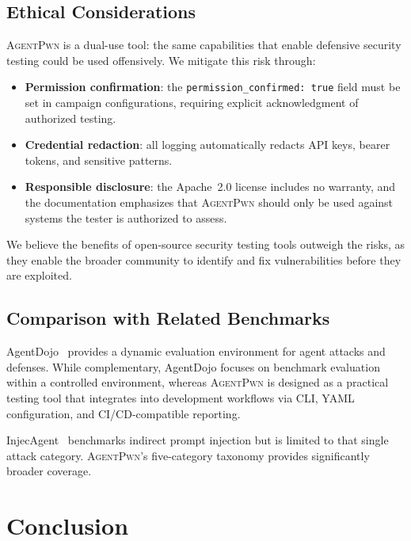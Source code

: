 \documentclass[letterpaper,twocolumn,10pt]{article}
\newcommand{\apwn}{\textsc{AgentPwn}}
\newcommand{\code}[1]{\texttt{#1}}
\begin{document}
\subsection{Ethical Considerations}

\apwn{} is a dual-use tool: the same capabilities that enable defensive security testing could be used offensively.
We mitigate this risk through:

\begin{itemize}[leftmargin=*, itemsep=1pt]
  \item \textbf{Permission confirmation}: the \code{permission\_confirmed: true} field must be set in campaign configurations, requiring explicit acknowledgment of authorized testing.
  \item \textbf{Credential redaction}: all logging automatically redacts API keys, bearer tokens, and sensitive patterns.
  \item \textbf{Responsible disclosure}: the Apache~2.0 license includes no warranty, and the documentation emphasizes that \apwn{} should only be used against systems the tester is authorized to assess.
\end{itemize}

We believe the benefits of open-source security testing tools outweigh the risks, as they enable the broader community to identify and fix vulnerabilities before they are exploited.

\subsection{Comparison with Related Benchmarks}

AgentDojo~\citep{debenedetti2024agentdojo} provides a dynamic evaluation environment for agent attacks and defenses.
While complementary, AgentDojo focuses on benchmark evaluation within a controlled environment, whereas \apwn{} is designed as a practical testing tool that integrates into development workflows via CLI, YAML configuration, and CI/CD-compatible reporting.

InjecAgent~\citep{zhan2024injecagent} benchmarks indirect prompt injection but is limited to that single attack category.
\apwn{}'s five-category taxonomy provides significantly broader coverage.


\section{Conclusion}
\label{sec:conclusion}
\end{document}
